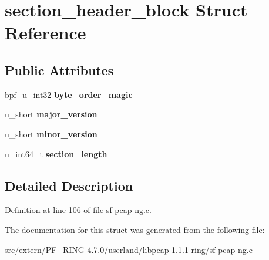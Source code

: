 \hypertarget{structsection__header__block}{
\section{section\_\-header\_\-block Struct Reference}
\label{structsection__header__block}
}
\subsection*{Public Attributes}
\begin{DoxyCompactItemize}
\item 
\hypertarget{structsection__header__block_a79a5263c0b926219b752f159325172fc}{
bpf\_\-u\_\-int32 {\bfseries byte\_\-order\_\-magic}}
\label{structsection__header__block_a79a5263c0b926219b752f159325172fc}

\item 
\hypertarget{structsection__header__block_a2495c09bdc54af414d6cd3c7d78a707f}{
u\_\-short {\bfseries major\_\-version}}
\label{structsection__header__block_a2495c09bdc54af414d6cd3c7d78a707f}

\item 
\hypertarget{structsection__header__block_a9e9ea6643d09da58450e4472852890e7}{
u\_\-short {\bfseries minor\_\-version}}
\label{structsection__header__block_a9e9ea6643d09da58450e4472852890e7}

\item 
\hypertarget{structsection__header__block_a024659114f1bc89b68db6fb2013fa785}{
u\_\-int64\_\-t {\bfseries section\_\-length}}
\label{structsection__header__block_a024659114f1bc89b68db6fb2013fa785}

\end{DoxyCompactItemize}


\subsection{Detailed Description}


Definition at line 106 of file sf-\/pcap-\/ng.c.



The documentation for this struct was generated from the following file:\begin{DoxyCompactItemize}
\item 
src/extern/PF\_\-RING-\/4.7.0/userland/libpcap-\/1.1.1-\/ring/sf-\/pcap-\/ng.c\end{DoxyCompactItemize}
